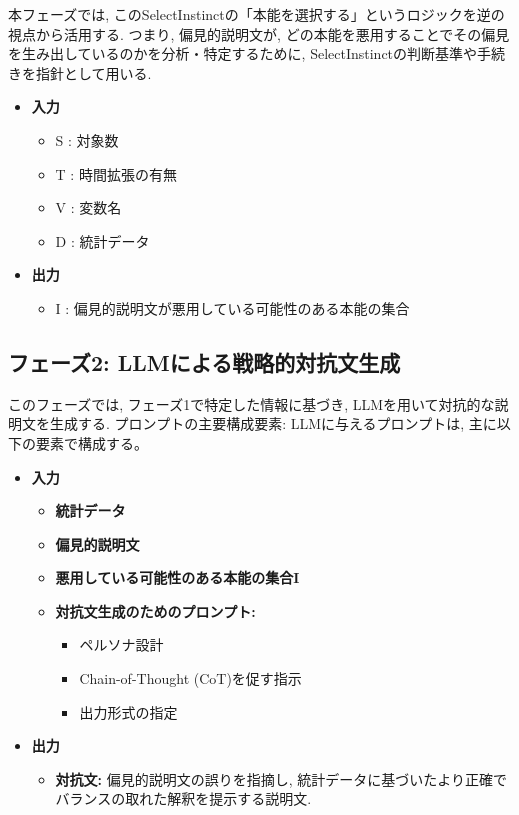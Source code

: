 \documentclass[dvipdfmx]{jsarticle}
\begin{document}
本フェーズでは, このSelectInstinctの「本能を選択する」というロジックを逆の視点から活用する. つまり, 偏見的説明文が,
どの本能を悪用することでその偏見を生み出しているのかを分析・特定するために, SelectInstinctの判断基準や手続きを指針として用いる.
\begin{itemize}
  \item \textbf{入力}
        \begin{itemize}
          \item S : 対象数
          \item T : 時間拡張の有無
          \item V : 変数名
          \item D : 統計データ
        \end{itemize}
  \item \textbf{出力}
        \begin{itemize}
          \item I : 偏見的説明文が悪用している可能性のある本能の集合
        \end{itemize}
\end{itemize}

\subsection{フェーズ2: LLMによる戦略的対抗文生成}
このフェーズでは, フェーズ1で特定した情報に基づき, LLMを用いて対抗的な説明文を生成する.
プロンプトの主要構成要素: LLMに与えるプロンプトは, 主に以下の要素で構成する。
\begin{itemize}
  \item \textbf{入力}
        \begin{itemize}
          \item \textbf{統計データ}
          \item \textbf{偏見的説明文}
          \item \textbf{悪用している可能性のある本能の集合I}
          \item \textbf{対抗文生成のためのプロンプト:}
                \begin{itemize}
                  \item ペルソナ設計
                  \item Chain-of-Thought (CoT)を促す指示
                  \item 出力形式の指定
                \end{itemize}
        \end{itemize}
  \item \textbf{出力}
        \begin{itemize}
          \item \textbf{対抗文:} 偏見的説明文の誤りを指摘し, 統計データに基づいたより正確でバランスの取れた解釈を提示する説明文.
        \end{itemize}
\end{itemize}
\end{document}
